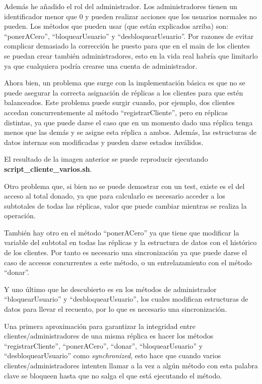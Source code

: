 \documentclass{article}
\begin{document}
Además he añadido el rol del administrador. Los administradores tienen un identificador menor que 0 y pueden realizar acciones que los usuarios normales no pueden. Los métodos que pueden usar (que están explicados arriba) son: ``ponerACero'', ``bloquearUsuario'' y ``desbloquearUsuario''. Por razones de evitar complicar demasiado la corrección he puesto para que en el main de los clientes se puedan crear también administradores, esto en la vida real habría que limitarlo ya que cualquiera podría crearse una cuenta de administrador.



Ahora bien, un problema que surge con la implementación básica es que no se puede asegurar la correcta asignación de réplicas a los clientes para que estén balanceados. Este problema puede surgir cuando, por ejemplo, dos clientes accedan concurrentemente al método ``registrarCliente'', pero en réplicas distintas, ya que puede darse el caso que en un momento dado una réplica tenga menos que las demás y se asigne esta réplica a ambos. Además, las estructuras de datos internas son modificadas y pueden darse estados inválidos.


El resultado de la imagen anterior se puede reproducir ejecutando \textbf{script\_cliente\_varios.sh}.

Otro problema que, si bien no se puede demostrar con un test, existe es el del acceso al total donado, ya que para calcularlo es necesario acceder a los subtotales de todas las réplicas, valor que puede cambiar mientras se realiza la operación.

También hay otro en el método ``ponerACero'' ya que tiene que modificar la variable del subtotal en todas las réplicas y la estructura de datos con el histórico de los clientes. Por tanto es necesario una sincronización ya que puede darse el caso de accesos concurrentes a este método, o un entrelazamiento con el método ``donar''.

Y uno último que he descubierto es en los métodos de administrador ``bloquearUsuario'' y ``desbloquearUsuario'', los cuales modifican estructuras de datos para llevar el recuento, por lo que es necesario una sincronización.

Una primera aproximación para garantizar la integridad entre clientes/administradores de una misma réplica es hacer los métodos ``registrarCliente'', ``ponerACero'', ``donar'', ``bloquearUsuario'' y ``desbloquearUsuario'' como \textit{synchronized}, esto hace que cuando varios clientes/administradores intenten llamar a la vez a algún método con esta palabra clave se bloqueen hasta que no salga el que está ejecutando el método.
\end{document}
